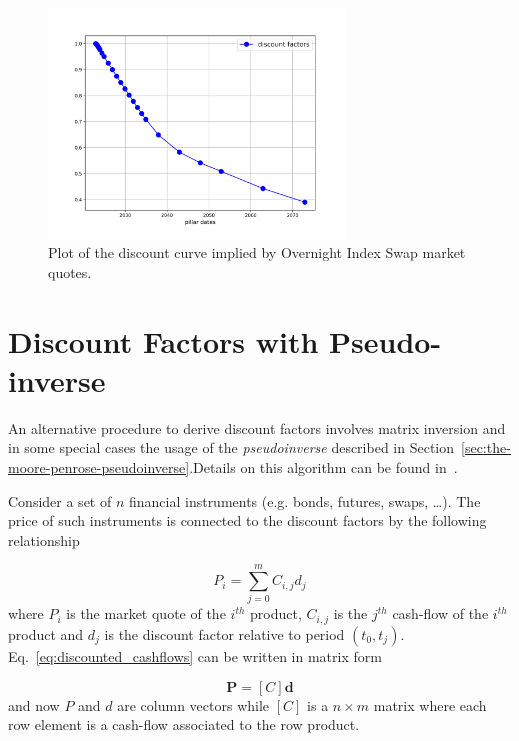 \begin{figure}[htb]
	\centering
	\includegraphics[width=0.7\textwidth]{figures/example_discount_curve}
	\caption{Plot of the discount curve implied by Overnight Index Swap market quotes.}
	\label{fig:discount_curve}
\end{figure}

\section{Discount Factors with Pseudo-inverse}
An alternative procedure to derive discount factors involves matrix inversion and in some special cases the usage of the \emph{pseudoinverse} described in Section~\ref{sec:the-moore-penrose-pseudoinverse}.Details on this algorithm can be found in~\cite{bib:boostrap_pseudoinv}.

Consider a set of $n$ financial instruments (e.g. bonds, futures, swaps, \ldots). The price of such instruments is connected to the discount factors by the following relationship

\begin{equation}
P_i = \sum_{j=0}^{m} C_{i,j} d_j
\label{eq:discounted_cashflows}
\end{equation}
where $P_i$ is the market quote of the $i^{th}$ product, $C_{i,j}$ is the $j^{th}$ cash-flow of the $i^{th}$ product and $d_j$ is the discount factor relative to period $(t_0, t_j)$.
Eq.~\ref{eq:discounted_cashflows} can be written in matrix form

\begin{equation}
\boldsymbol{P} = [C]\boldsymbol{d}
\label{eq:discount_matrix}
\end{equation}
and now $P$ and $d$ are column vectors while $[C]$ is a $n \times m$ matrix where each row element is a cash-flow associated to the row product.


